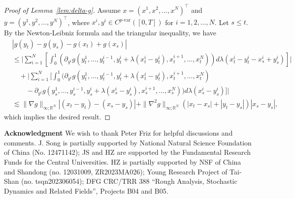 \documentclass[11pt,reqno]{amsart}
\numberwithin{equation}{section}
\begin{document}
\begin{proof}[Proof of Lemma~\ref{lem:delta-g}]
\makeatletter{}\makeatother
\label{proof:epsilon}
Assume $x = (x^1,x^2,...,x^N)^{\top}$ and $y = (y^1,y^2,...,y^N)^{\top}$, where $x^{i},y^{i}\in C^{p\text{-var}}([0,T])$ for $i=1,2,...,N$. Let $s\le t$. By the Newton-Leibniz formula and the triangular inequality, we have
\begin{equation*}
\begin{aligned}
&|g(y_t) - g(y_s) - g(x_t) +g(x_s)| \\
&\le \Big|\sum_{i=1}^{N}\left[\int_{0}^{1}\left(\partial_{y^i}g(y^{1}_t,...,y^{i-1}_t,y^{i}_t + \lambda(x^{i}_t - y^{i}_t),x^{i+1}_t,...,x^{N}_t)\right)d\lambda(x^{i}_{t} - y^{i}_t - x^{i}_{s} + y^{i}_s)\right]\Big|\\
&\quad + \Big|\sum_{i=1}^{N}\Big[\int_{0}^{1}\big(\partial_{y^i}g(y^{1}_t,...,y^{i-1}_t,y^{i}_t + \lambda(x^{i}_t - y^{i}_t),x^{i+1}_t,...,x^{N}_t) \\
&\quad \quad - \partial_{y^i}g(y^{1}_s,...,y^{i-1}_s,y^{i}_s + \lambda(x^{i}_s - y^{i}_s),x^{i+1}_s,...,x^{N}_s)\big)d\lambda(x^{i}_{s} - y^{i}_{s})\Big]\Big|\\
&\lesssim \|\nabla g\|_{\infty;\mathbb{R}^N}|(x_{t} - y_{t}) - (x_{s} - y_{s})| + \|\nabla^2 g\|_{\infty;\mathbb{R}^{N}}  (|x_{t} - x_{s}| + |y_{t} - y_{s}|)|x_{s} - y_{s}|,
\end{aligned}
\end{equation*}
which implies the desired result.
\end{proof}






{\bf Acknowledgment}   We wish to thank Peter Friz for helpful discussions and comments. J. Song is partially supported by National Natural Science Foundation of China (No. 12471142); JS and HZ are supported by the Fundamental Research Funds for the Central Universities. HZ is partially supported by NSF of China and Shandong (no. 12031009, ZR2023MA026); Young Research Project of Tai-Shan (no. tsqn202306054);
DFG CRC/TRR 388 ``Rough Analysis, Stochastic Dynamics and Related Fields'', Projects B04 and B05.



\end{document}
